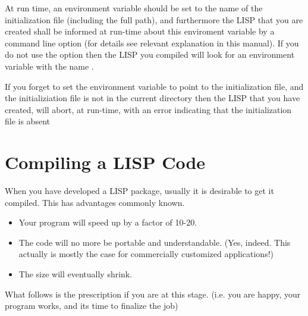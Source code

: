 \begin{enumerate}
{     At run time, an environment variable should be set to the
     name of the initialization
     file (including the full path), and furthermore
     the LISP that you are created shall be informed
     at run-time     about this
     enviroment variable by a command line option  (for
     details see relevant explanation in this manual).
      If you do not use the
      option then the LISP you compiled will look for
     an environment variable with the name .

     If you forget to set the environment variable
     to point to the initialization file, and the initializiation
     file is not in the current directory then
      the LISP that you have created, will
          abort, at run-time, with an error indicating that the
          initialization file  is absent}
\end{enumerate}

\section{Compiling a LISP Code}

When you have developed a LISP package, usually it is desirable to get
it compiled. This has advantages commonly known.
\begin{itemize}
\item
     Your program will speed up by a factor of 10-20.
\item
     The code will no more be portable and understandable. (Yes, indeed.
     This  actually is mostly the case for commercially
     customized applications!)
\item
     The size will eventually shrink.
\end{itemize}
What follows is the prescription if you are at this stage. (i.e. you are
happy, your program works, and its time to finalize the job)

